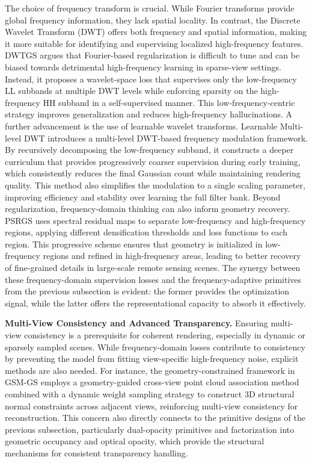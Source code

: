 \documentclass[11pt]{article}
\begin{document}
The choice of frequency transform is crucial. While Fourier transforms provide global frequency information, they lack spatial locality. In contrast, the Discrete Wavelet Transform (DWT) offers both frequency and spatial information, making it more suitable for identifying and supervising localized high-frequency features. DWTGS \cite{ref77} argues that Fourier-based regularization is difficult to tune and can be biased towards detrimental high-frequency learning in sparse-view settings. Instead, it proposes a wavelet-space loss that supervises only the low-frequency LL subbands at multiple DWT levels while enforcing sparsity on the high-frequency HH subband in a self-supervised manner. This low-frequency-centric strategy improves generalization and reduces high-frequency hallucinations. A further advancement is the use of learnable wavelet transforms. Learnable Multi-level DWT \cite{ref78} introduces a multi-level DWT-based frequency modulation framework. By recursively decomposing the low-frequency subband, it constructs a deeper curriculum that provides progressively coarser supervision during early training, which consistently reduces the final Gaussian count while maintaining rendering quality. This method also simplifies the modulation to a single scaling parameter, improving efficiency and stability over learning the full filter bank. Beyond regularization, frequency-domain thinking can also inform geometry recovery. PSRGS \cite{ref79} uses spectral residual maps to separate low-frequency and high-frequency regions, applying different densification thresholds and loss functions to each region. This progressive scheme ensures that geometry is initialized in low-frequency regions and refined in high-frequency areas, leading to better recovery of fine-grained details in large-scale remote sensing scenes. The synergy between these frequency-domain supervision losses and the frequency-adaptive primitives from the previous subsection is evident: the former provides the optimization signal, while the latter offers the representational capacity to absorb it effectively.

\textbf{Multi-View Consistency and Advanced Transparency.} Ensuring multi-view consistency is a prerequisite for coherent rendering, especially in dynamic or sparsely sampled scenes. While frequency-domain losses contribute to consistency by preventing the model from fitting view-specific high-frequency noise, explicit methods are also needed. For instance, the geometry-constrained framework in GSM-GS \cite{ref80} employs a geometry-guided cross-view point cloud association method combined with a dynamic weight sampling strategy to construct 3D structural normal constraints across adjacent views, reinforcing multi-view consistency for reconstruction. This concern also directly connects to the primitive designs of the previous subsection, particularly dual-opacity primitives and factorization into geometric occupancy and optical opacity, which provide the structural mechanisms for consistent transparency handling.
\end{document}
